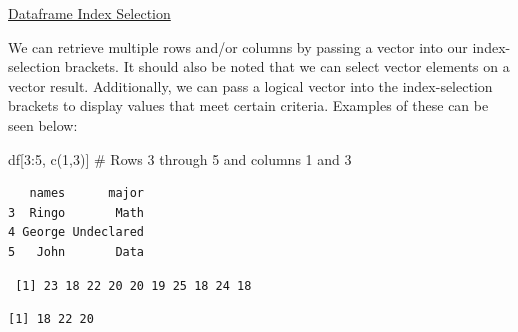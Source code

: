 \documentclass[
  letterpaper,
  DIV=11,
  numbers=noendperiod]{scrreprt}
\newenvironment{Shaded}{\begin{snugshade}}{\end{snugshade}}
\newcommand{\CommentTok}[1]{\textcolor[rgb]{0.37,0.37,0.37}{#1}}
\newcommand{\DecValTok}[1]{\textcolor[rgb]{0.68,0.00,0.00}{#1}}
\newcommand{\FunctionTok}[1]{\textcolor[rgb]{0.28,0.35,0.67}{#1}}
\newcommand{\NormalTok}[1]{\textcolor[rgb]{0.00,0.23,0.31}{#1}}
\newcommand{\SpecialCharTok}[1]{\textcolor[rgb]{0.37,0.37,0.37}{#1}}
\begin{document}
\begin{watch}{}{}
    \href{https://youtu.be/Sgaa-F_HEYo}{Dataframe Index Selection}
\end{watch}

We can retrieve multiple rows and/or columns by passing a vector into
our index-selection brackets. It should also be noted that we can select
vector elements on a vector result. Additionally, we can pass a logical
vector into the index-selection brackets to display values that meet
certain criteria. Examples of these can be seen below:

\begin{Shaded}
\begin{Highlighting}[]
\NormalTok{df[}\DecValTok{3}\SpecialCharTok{:}\DecValTok{5}\NormalTok{, }\FunctionTok{c}\NormalTok{(}\DecValTok{1}\NormalTok{,}\DecValTok{3}\NormalTok{)] }\CommentTok{\# Rows 3 through 5 and columns 1 and 3 }
\end{Highlighting}
\end{Shaded}

\begin{verbatim}
   names      major
3  Ringo       Math
4 George Undeclared
5   John       Data
\end{verbatim}

\begin{Shaded}
\end{Shaded}

\begin{verbatim}
 [1] 23 18 22 20 20 19 25 18 24 18
\end{verbatim}

\begin{Shaded}
\end{Shaded}

\begin{verbatim}
[1] 18 22 20
\end{verbatim}

\begin{Shaded}
\end{Shaded}
\end{document}
